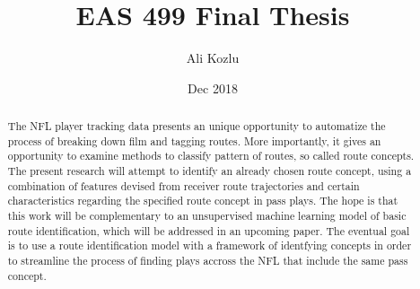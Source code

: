 \documentclass[12pt,oneside]{dukestatscithesis}
\title{EAS 499 Final Thesis}
\author{Ali Kozlu}
\date{Dec 2018}
\theoremstyle{definition}
\theoremstyle{definition}
\theoremstyle{definition}
\theoremstyle{remark}
\begin{document}
  \maketitle

\frontmatter %
\pagestyle{empty} %



  \hypersetup{linkcolor=black}
  \setcounter{tocdepth}{2}
  \tableofcontents

  \listoftables

  \listoffigures
  \begin{abstract}
    The NFL player tracking data presents an unique opportunity to
    automatize the process of breaking down film and tagging routes. More
    importantly, it gives an opportunity to examine methods to classify
    pattern of routes, so called route concepts. The present research will
    attempt to identify an already chosen route concept, using a combination
    of features devised from receiver route trajectories and certain
    characteristics regarding the specified route concept in pass plays. The
    hope is that this work will be complementary to an unsupervised machine
    learning model of basic route identification, which will be addressed in
    an upcoming paper. The eventual goal is to use a route identification
    model with a framework of identfying concepts in order to streamline the
    process of finding plays accross the NFL that include the same pass
    concept.
  \end{abstract}

\mainmatter %
\pagestyle{fancyplain} %
\end{document}
